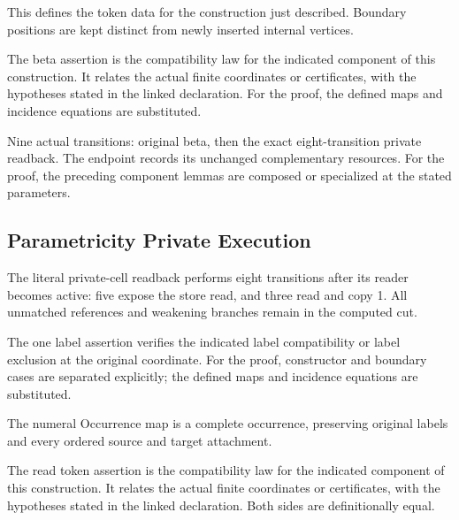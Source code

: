 This defines the token data for the construction just described. Boundary positions are kept distinct from newly inserted internal vertices.
\par{}

The beta assertion is the compatibility law for the indicated component of this construction. It relates the actual finite coordinates or certificates, with the hypotheses stated in the linked declaration.
For the proof, the defined maps and incidence equations are substituted.
\par{}

Nine actual transitions: original beta, then the exact eight-transition private readback. The endpoint records its unchanged complementary resources.
For the proof, the preceding component lemmas are composed or specialized at the stated parameters.
\par{}

\subsection{Parametricity Private Execution}
The literal private-cell readback performs eight transitions after its reader becomes active: five expose the store read, and three read and copy 1. All unmatched references and weakening branches remain in the computed cut.

The one label assertion verifies the indicated label compatibility or label exclusion at the original coordinate.
For the proof, constructor and boundary cases are separated explicitly; the defined maps and incidence equations are substituted.
\par{}

The numeral Occurrence map is a complete occurrence, preserving original labels and every ordered source and target attachment.
\par{}

The read token assertion is the compatibility law for the indicated component of this construction. It relates the actual finite coordinates or certificates, with the hypotheses stated in the linked declaration.
Both sides are definitionally equal.
\par{}

